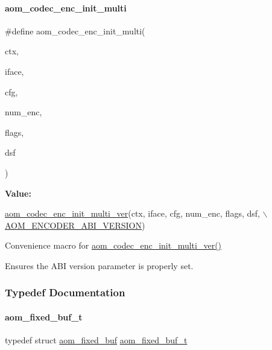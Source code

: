 \paragraph{\texorpdfstring{aom\+\_\+codec\+\_\+enc\+\_\+init\+\_\+multi}{aom\_codec\_enc\_init\_multi}}
{\footnotesize\ttfamily \#define aom\+\_\+codec\+\_\+enc\+\_\+init\+\_\+multi(\begin{DoxyParamCaption}\item[{}]{ctx,  }\item[{}]{iface,  }\item[{}]{cfg,  }\item[{}]{num\+\_\+enc,  }\item[{}]{flags,  }\item[{}]{dsf }\end{DoxyParamCaption})}

{\bfseries Value\+:}
\begin{DoxyCode}
\hyperlink{group__encoder_gad3dfb2298402298abadb2c1b059b5f0b}{aom\_codec\_enc\_init\_multi\_ver}(ctx, iface, cfg, num\_enc, flags, dsf,   \(\backslash\)
                               \hyperlink{group__encoder_gae4af664f2049d5b7d7b644d9a61d497c}{AOM\_ENCODER\_ABI\_VERSION})
\end{DoxyCode}


Convenience macro for \hyperlink{group__encoder_gad3dfb2298402298abadb2c1b059b5f0b}{aom\+\_\+codec\+\_\+enc\+\_\+init\+\_\+multi\+\_\+ver()} 

Ensures the A\+BI version parameter is properly set. 

\subsubsection{Typedef Documentation}
\mbox{\label{group__encoder_ga85cca9fad6bc25c667f013a39c607174}} 
\paragraph{\texorpdfstring{aom\+\_\+fixed\+\_\+buf\+\_\+t}{aom\_fixed\_buf\_t}}
{\footnotesize\ttfamily typedef struct \hyperlink{structaom__fixed__buf}{aom\+\_\+fixed\+\_\+buf}  \hyperlink{group__encoder_ga85cca9fad6bc25c667f013a39c607174}{aom\+\_\+fixed\+\_\+buf\+\_\+t}}



